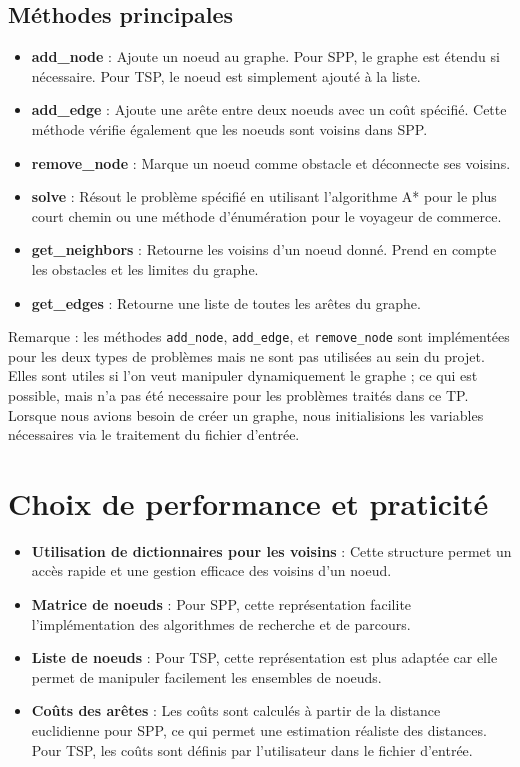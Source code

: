 \subsection{Méthodes principales}
\begin{itemize}
    \item \textbf{add\_node} : Ajoute un noeud au graphe. Pour \ac{SPP}, le graphe est étendu si nécessaire. Pour \ac{TSP}, le noeud est simplement ajouté à la liste.
    \item \textbf{add\_edge} : Ajoute une arête entre deux noeuds avec un coût spécifié. Cette méthode vérifie également que les noeuds sont voisins dans \ac{SPP}.
    \item \textbf{remove\_node} : Marque un noeud comme obstacle et déconnecte ses voisins.
    \item \textbf{solve} : Résout le problème spécifié en utilisant l'algorithme A* pour le plus court chemin ou une méthode d'énumération pour le voyageur de commerce.
    \item \textbf{get\_neighbors} : Retourne les voisins d'un noeud donné. Prend en compte les obstacles et les limites du graphe.
    \item \textbf{get\_edges} : Retourne une liste de toutes les arêtes du graphe.
\end{itemize}

Remarque : les méthodes \texttt{add\_node}, \texttt{add\_edge}, et \texttt{remove\_node} sont implémentées pour les deux types de problèmes mais ne sont pas utilisées au sein du projet. Elles sont utiles si l'on veut manipuler dynamiquement le graphe ; ce qui est possible, mais n'a pas été necessaire pour les problèmes traités dans ce TP. Lorsque nous avions besoin de créer un graphe, nous initialisions les variables nécessaires via le traitement du fichier d'entrée.

\section{Choix de performance et praticité}
\begin{itemize}
    \item \textbf{Utilisation de dictionnaires pour les voisins} : Cette structure permet un accès rapide et une gestion efficace des voisins d'un noeud.
    \item \textbf{Matrice de noeuds} : Pour \ac{SPP}, cette représentation facilite l'implémentation des algorithmes de recherche et de parcours.
    \item \textbf{Liste de noeuds} : Pour \ac{TSP}, cette représentation est plus adaptée car elle permet de manipuler facilement les ensembles de noeuds.
    \item \textbf{Coûts des arêtes} : Les coûts sont calculés à partir de la distance euclidienne pour \ac{SPP}, ce qui permet une estimation réaliste des distances. Pour \ac{TSP}, les coûts sont définis par l'utilisateur dans le fichier d'entrée.
\end{itemize}


